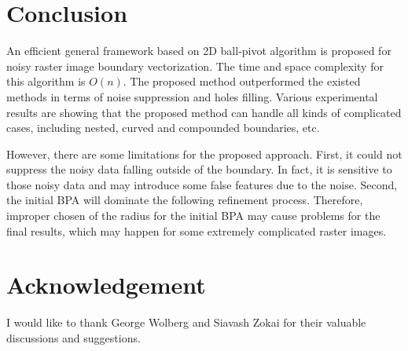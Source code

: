 \documentclass{article}
\begin{document}
\section{Conclusion}

An efficient general framework based on 2D ball-pivot algorithm is proposed
for noisy raster image boundary vectorization.
The time and space complexity for this algorithm is $O(n)$.
The proposed method outperformed the existed methods in terms of noise suppression and
holes filling. Various experimental results are showing that the proposed method
can handle all kinds of complicated cases, including nested,
curved and compounded boundaries, etc.

However, there are some limitations for the proposed approach. First, it could
not suppress the noisy data falling outside of the boundary. In fact, it is
sensitive to those noisy data and may introduce some false features due to the noise.
Second, the initial BPA will dominate the following refinement process. Therefore, improper chosen of the
radius for the initial BPA may cause problems for the final results, which may
happen for some extremely complicated raster images.

\section{Acknowledgement}
I would like to thank George Wolberg and Siavash Zokai for their valuable discussions
and suggestions.

%
%
%
%
\end{document}
